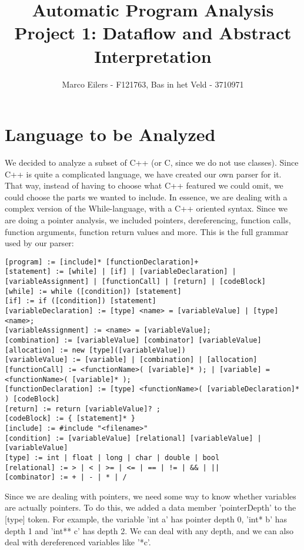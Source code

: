 \documentclass[a4paper,11pt]{article}
\begin{document}
\title{Automatic Program Analysis\\Project 1: Dataflow and Abstract Interpretation}
\author{Marco Eilers - F121763, Bas in het Veld - 3710971}

\maketitle

\section{Language to be Analyzed}
We decided to analyze a subset of C++ (or C, since we do not use classes). 
Since C++ is quite a complicated language, we have created our own parser for it. That way, instead of having to choose what C++ featured we could omit, we could choose the parts we wanted to include. In essence, we are dealing with a complex version of the While-language, with a C++ oriented syntax. Since we are doing a pointer analysis, we included pointers, dereferencing, function calls, function arguments, function return values and more. This is the full grammar used by our parser:

\begin{lstlisting}[breaklines=true]
[program] := [include]* [functionDeclaration]+
[statement] := [while] | [if] | [variableDeclaration] | [variableAssignment] | [functionCall] | [return] | [codeBlock]
[while] := while ([condition]) [statement]
[if] := if ([condition]) [statement]
[variableDeclaration] := [type] <name> = [variableValue] | [type] <name>;
[variableAssignment] := <name> = [variableValue];
[combination] := [variableValue] [combinator] [variableValue]
[allocation] := new [type]([variableValue])
[variableValue] := [variable] | [combination] | [allocation]
[functionCall] := <functionName>( [variable]* ); | [variable] = <functionName>( [variable]* );
[functionDeclaration] := [type] <functionName>( [variableDeclaration]* ) [codeBlock]
[return] := return [variableValue]? ;
[codeBlock] := { [statement]* }
[include] := #include "<filename>"
[condition] := [variableValue] [relational] [variableValue] | [variableValue]
[type] := int | float | long | char | double | bool
[relational] := > | < | >= | <= | == | != | && | ||
[combinator] := + | - | * | /
\end{lstlisting}

Since we are dealing with pointers, we need some way to know whether variables are actually pointers. To do this, we added a data member 'pointerDepth' to the [type] token. For example, the variable 'int a' has pointer depth 0, 'int* b' has depth 1 and 'int** c' has depth 2. We can deal with any depth, and we can also deal with dereferenced variables like '*c'.
\end{document}
